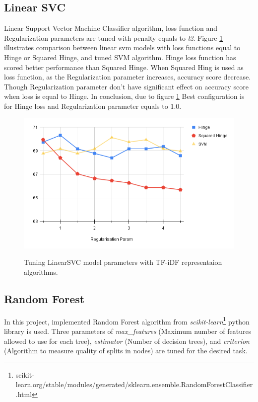 \subsection{Linear SVC}
Linear Support Vector Machine Classifier algorithm, loss function and Regularization parameters are tuned with penalty equals to \textit{l2}. Figure \ref{fig:linearsvm} illustrates comparison between linear svm models with loss functions equal to Hinge or Squared Hinge, and tuned SVM algorithm. Hinge loss function has scored better performance than Squared Hinge. When Squared Hing is used as loss function, as the Regularization parameter increases, accuracy score decrease. Though Regularization parameter don't have significant effect on accuracy score when loss is equal to Hinge. In conclusion, due to figure \ref{fig:linearsvm} Best configuration is for Hinge loss and Regularization parameter equals to 1.0. 
\begin{figure}%
	\centering
	{\includegraphics[width=12.5cm]{statistics/linearsvm.png} }
	\caption{Tuning LinearSVC model parameters with TF-iDF representaion algorithms.}%
	\label{fig:linearsvm}%
\end{figure}
\subsection{Random Forest}
In this project, implemented Random Forest algorithm from \textit{scikit-learn}\footnote{scikit-learn.org/stable/modules/generated/sklearn.ensemble.RandomForestClassifier.html} python library is used. Three parameters of \textit{max\_features} (Maximum number of features allowed to use for each tree), \textit{estimator} (Number of decision trees), and \textit{criterion} (Algorithm to measure quality of splits in nodes) are tuned for the desired task.

